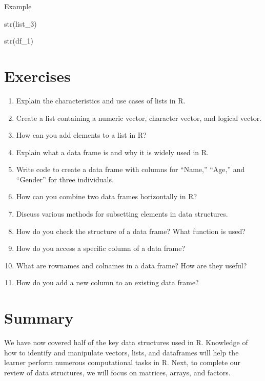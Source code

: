 \documentclass[
  letterpaper,
  DIV=11,
  numbers=noendperiod]{scrreprt}
\newenvironment{Shaded}{}{}
\newcommand{\FunctionTok}[1]{\textcolor[rgb]{0.44,0.26,0.76}{#1}}
\newcommand{\NormalTok}[1]{\textcolor[rgb]{0.14,0.16,0.18}{#1}}
\begin{document}
Example

\begin{Shaded}
\begin{Highlighting}[]
\FunctionTok{str}\NormalTok{(list\_3)}
\end{Highlighting}
\end{Shaded}

\begin{Shaded}
\begin{Highlighting}[]
\FunctionTok{str}\NormalTok{(df\_1)}
\end{Highlighting}
\end{Shaded}

\section{Exercises}\label{exercises-9}

\begin{enumerate}
\def\labelenumi{\roman{enumi}.}
\item
  Explain the characteristics and use cases of lists in R.
\item
  Create a list containing a numeric vector, character vector, and
  logical vector.
\item
  How can you add elements to a list in R?
\item
  Explain what a data frame is and why it is widely used in R.
\item
  Write code to create a data frame with columns for ``Name,'' ``Age,''
  and ``Gender'' for three individuals.
\item
  How can you combine two data frames horizontally in R?
\item
  Discuss various methods for subsetting elements in data structures.
\item
  How do you check the structure of a data frame? What function is used?
\item
  How do you access a specific column of a data frame?
\item
  What are rownames and colnames in a data frame? How are they useful?
\item
  How do you add a new column to an existing data frame?
\end{enumerate}

\section{Summary}\label{summary-9}

We have now covered half of the key data structures used in R. Knowledge
of how to identify and manipulate vectors, lists, and dataframes will
help the learner perform numerous computational tasks in R. Next, to
complete our review of data structures, we will focus on matrices,
arrays, and factors.
\end{document}
